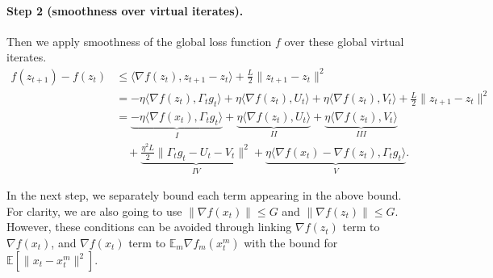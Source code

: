 \paragraph{Step 2 (smoothness over virtual iterates).} Then we apply smoothness of the global loss function $f$ over these global virtual iterates.
\begin{align*}
f(z_{t+1}) - f(z_t)
&\leq \langle \nabla f(z_t), z_{t+1}-z_t \rangle + \frac{L}{2}\|z_{t+1}-z_t\|^2 \\
&= -\eta\langle \nabla f(z_t), \Gamma_t g_t \rangle
   + \eta\langle \nabla f(z_t), U_t \rangle
   + \eta\langle \nabla f(z_t), V_t \rangle
   + \frac{L}{2}\|z_{t+1}-z_t\|^2 \\
&= \underbrace{-\eta\langle \nabla f(x_t), \Gamma_t g_t \rangle}_{I}
   + \underbrace{\eta\langle \nabla f(z_t), U_t \rangle}_{II}
   + \underbrace{\eta\langle \nabla f(z_t), V_t \rangle}_{III} \\
&\quad + \underbrace{\frac{\eta^2 L}{2}\|\Gamma_t g_t - U_t - V_t\|^2}_{IV}
   + \underbrace{\eta\langle \nabla f(x_t) - \nabla f(z_t), \Gamma_t g_t \rangle}_{V}.
\end{align*}

In the next step, we separately bound each term appearing in the above bound. For clarity, we are also going to use $\|\nabla f(x_t)\| \leq G$ and $\|\nabla f(z_t)\| \leq G$. However, these conditions can be avoided through linking $\nabla f(z_t)$ term to $\nabla f(x_t)$, and $\nabla f(x_t)$ term to $\mathbb{E}_m \nabla f_m(x_t^m)$ with the bound for $\mathbb{E}[\|x_t - x_t^m\|^2]$.

